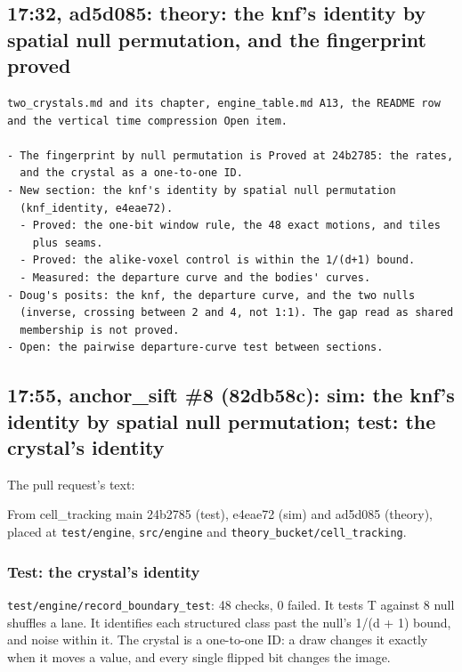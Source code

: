 \subsection{\texorpdfstring{17:32, ad5d085: theory: the knf's identity by spatial null permutation, and the fingerprint proved}{17:32, ad5d085: theory: the knf's identity by spatial null permutation, and the fingerprint proved}}

\begin{Verbatim}
two_crystals.md and its chapter, engine_table.md A13, the README row
and the vertical time compression Open item.

- The fingerprint by null permutation is Proved at 24b2785: the rates,
  and the crystal as a one-to-one ID.
- New section: the knf's identity by spatial null permutation
  (knf_identity, e4eae72).
  - Proved: the one-bit window rule, the 48 exact motions, and tiles
    plus seams.
  - Proved: the alike-voxel control is within the 1/(d+1) bound.
  - Measured: the departure curve and the bodies' curves.
- Doug's posits: the knf, the departure curve, and the two nulls
  (inverse, crossing between 2 and 4, not 1:1). The gap read as shared
  membership is not proved.
- Open: the pairwise departure-curve test between sections.
\end{Verbatim}

\subsection{\texorpdfstring{17:55, anchor\_\allowbreak{}sift \#8 (82db58c): sim: the knf's identity by spatial null permutation; test: the crystal's identity}{17:55, anchor\_sift \#8 (82db58c): sim: the knf's identity by spatial null permutation; test: the crystal's identity}}

The pull request's text:

From cell\_\allowbreak{}tracking main 24b2785 (test), e4eae72 (sim) and ad5d085 (theory), placed at \texttt{test/\allowbreak{}engine}, \texttt{src/\allowbreak{}engine} and \texttt{theory\_\allowbreak{}bucket/\allowbreak{}cell\_\allowbreak{}tracking}.

\subsubsection{\texorpdfstring{Test: the crystal's identity}{Test: the crystal's identity}}

\texttt{test/\allowbreak{}engine/\allowbreak{}record\_\allowbreak{}boundary\_\allowbreak{}test}: 48 checks, 0 failed. It tests T against 8 null shuffles a lane. It identifies each structured class past the null's 1/(d + 1) bound, and noise within it. The crystal is a one-to-one ID: a draw changes it exactly when it moves a value, and every single flipped bit changes the image.


